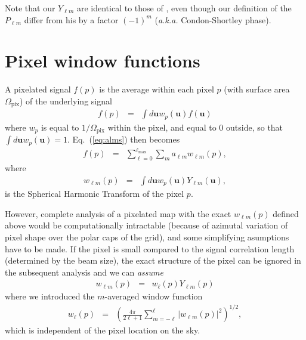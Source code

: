 \documentclass[12pt,twoside]{article}
\newcommand{\myhtmlimage}[1]{ }
\newcommand{\Opix}{\Omega_{\mathrm{pix}}}
\newcommand{\lmax}{\ell_{\mathrm{max}}}
\begin{document}
Note that our $Y_{\ell m}$ are identical to those of \citet{edmonds},
even though our definition of the $P_{\ell m}$ differ from his by a factor
$(-1)^m$ ({\it a.k.a.} Condon-Shortley phase).

\section{Pixel window functions}
\renewcommand{\u}{\textbf{u}}

A pixelated signal $f(p)$ is the average within each pixel $p$ (with surface
area $\Opix$) of the underlying signal 
\begin{eqnarray}
  f(p) &=& \int d\u w_p(\u)f(\u) \myhtmlimage{}
\end{eqnarray}
where $w_p$ is equal to $1/\Opix$ within the pixel, and equal to 0 outside, so
that $\int d\u w_p(\u) = 1$.
Eq.~(\ref{eq:alms}) then becomes
\begin{eqnarray}
  f(p) &=& \sum_{\ell =0}^{\lmax}\sum_{m}a_{\ell m}w_{\ell m}(p),
\myhtmlimage{}
\end{eqnarray}
where
\begin{eqnarray}
 	w_{\ell m}(p) &=& \int d\u w_p(\u) Y_{\ell m}(\u), \myhtmlimage{} \label{eq:pixel_lmp} 
\end{eqnarray}
is the Spherical Harmonic Transform of the pixel $p$.

However, complete analysis of a pixelated map with the exact $w_{\ell m}(p)$
defined above would be computationally intractable (because of azimutal
variation of pixel shape over the polar caps of the \healpix grid), 
and some simplifying asumptions have to be
made. If the pixel is small compared to the signal correlation length
(determined by the beam size), the exact structure of the pixel can be ignored
in the subsequent analysis and we can {\em assume}
\begin{eqnarray}
  w_{\ell m}(p) &=& w_\ell(p) Y_{\ell m}(p)\myhtmlimage{}
\end{eqnarray}
where we introduced the $m$-averaged window function
\begin{eqnarray}
	w_{\ell}(p) &=& \left(\frac{4 \pi}{2\ell+1}\sum_{m=-\ell}^{\ell} \left|w_{\ell m}(p)\right|^2\right)^{1/2},\myhtmlimage{}
	\label{eq:pixel_lp} 
\end{eqnarray}
which is independent of the pixel location on the sky.
\end{document}
